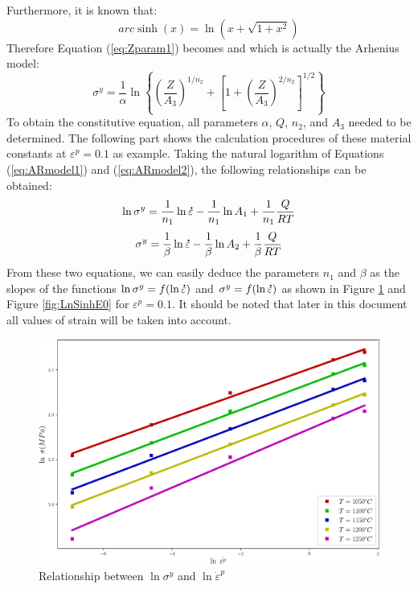 \documentclass[twoside,english,1p,final,sort&compress]{elsarticle}
\theoremstyle{plain}
\newcommand{\mdot}[1]{\accentset{\mbox{\bfseries .}}{#1}}
\begin{document}
Furthermore, it is known that:
\begin{equation}
arc\sinh(x) = \ln\left(x + \sqrt{1+x^2}\right)
\end{equation}
Therefore Equation (\ref{eq:Zparam1}) becomes and which is actually the Arhenius model:
\begin{equation}
\sigma^y = \frac{1}{\alpha}\ln\left\{\left(\frac{Z}{A_3}\right)^{1/n_2} + \left[1 + \left(\frac{Z}{A_3}\right)^{2/n_2}\right]^{1/2}\right\}
\end{equation}
To obtain the constitutive equation, all parameters $\alpha$, $Q$, $n_2$, and $A_3$ needed to be determined. The following part shows the calculation procedures of these material constants at $\varepsilon^p = 0.1$ as example. Taking the natural logarithm of Equations (\ref{eq:ARmodel1}) and (\ref{eq:ARmodel2}), the following relationships can be obtained:
\begin{equation}
\ln \sigma^y = \frac{1}{n_1}\ln \mdot\varepsilon -\frac{1}{n_1}\ln A_1 +  \frac{1}{n_1}\frac{Q}{RT}
\end{equation}
\begin{equation}
\sigma^y = \frac{1}{\beta}\ln \mdot\varepsilon - \frac{1}{\beta}\ln A_2 + \frac{1}{\beta}\frac{Q}{RT}
\end{equation}
From these two equations, we can easily deduce the parameters $n_1$ and $\beta$ as the slopes of the functions $\ln\sigma^y = f(\ln\mdot\varepsilon)$  and $\sigma^y = f(\ln\mdot\varepsilon)$ as shown in Figure \ref{fig:LnAlp} and Figure \ref{fig:LnSinhE0} for $\varepsilon^p = 0.1$. It should be noted that later in this document all values of strain will be taken into account.
\begin{figure}[!ht]
\centering
\includegraphics[width=0.9\columnwidth]{Figures/LnAlp}
\caption{Relationship between $\ln \sigma^y$ and $\ln \dot{\varepsilon}^p$}
\label{fig:LnAlp}
\end{figure}
\end{document}
